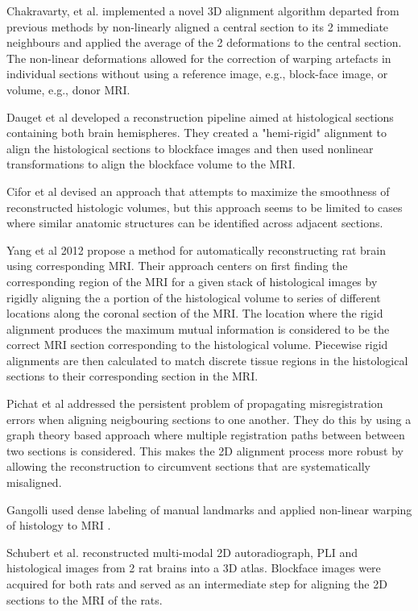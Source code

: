 \documentclass[12pt]{article}
\begin{document}
Chakravarty, et al. \cite{Chakravarty2003,Chakravarty2005} implemented a novel 3D alignment algorithm departed from previous methods by non-linearly aligned a central section to its 2 immediate neighbours and applied the average of the 2 deformations to the central section. The non-linear deformations allowed for the correction of warping artefacts in individual sections without using a reference image, e.g., block-face image, or volume, e.g., donor MRI. 

Dauget et al \cite{Dauget2007} developed a reconstruction pipeline aimed at histological sections containing both brain hemispheres. They created a "hemi-rigid" alignment to align the histological sections to blockface images and then used nonlinear transformations to align the blockface volume to the MRI. 

Cifor et al \cite{Cifor2011} devised an approach that attempts to maximize the smoothness of reconstructed histologic volumes, but this approach seems to be limited to cases where similar anatomic structures can be identified across adjacent sections.  


Yang et al 2012 \cite{Yang2012} propose a method for automatically reconstructing rat brain using corresponding MRI. Their approach centers on first finding the corresponding region of the MRI for a given stack of histological images by rigidly aligning the a portion of the histological volume to series of different locations along the coronal section of the MRI. The location where the rigid alignment produces the maximum mutual information is considered to be the correct MRI section corresponding to the histological volume. Piecewise rigid alignments are then calculated to match discrete tissue regions in the histological sections to their corresponding section in the MRI. 

Pichat et al \cite{Pichat2015} addressed the persistent problem of propagating misregistration errors when aligning neigbouring sections to one another. They do this by using a graph theory based approach where multiple registration paths between between two sections is considered. This makes the 2D alignment process more robust by allowing the reconstruction to circumvent sections that are systematically misaligned. 

Gangolli used dense labeling of manual landmarks and applied non-linear warping of histology to MRI \cite{Gangolli2017}.

Schubert et al. \cite{Schubert2018} reconstructed multi-modal 2D autoradiograph, PLI and histological images from 2 rat brains into a 3D atlas. Blockface images were acquired for both rats and served as an intermediate step for aligning the 2D sections to the MRI of the rats. 
\end{document}
